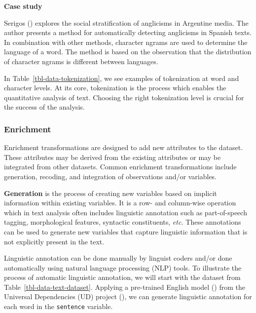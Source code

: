\documentclass[
  letterpaper,
  krantz1]{latex/krantz-mod}
\theoremstyle{definition}
\theoremstyle{definition}
\theoremstyle{remark}
\begin{document}
\begin{tcolorbox}[enhanced jigsaw, toprule=.15mm, breakable, colback=white, arc=.35mm, left=2mm, colframe=quarto-callout-color-frame, opacityback=0, bottomrule=.15mm, rightrule=.15mm, leftrule=.75mm]

\textbf{ Case study}

Serigos () explores the social
stratification of anglicisms in Argentine media. The author presents a
method for automatically detecting anglicisms in Spanish texts. In
combination with other methods, character ngrams are used to determine
the language of a word. The method is based on the observation that the
distribution of character ngrams is different between languages.

\end{tcolorbox}

In Table~\ref{tbl-data-tokenization}, we see examples of tokenization at
word and character levels. At its core,
tokenization is the process which enables the
quantitative analysis of text. Choosing the right tokenization level is
crucial for the success of the analysis.

\subsubsection{Enrichment}\label{enrichment}

Enrichment transformations are designed to add new attributes to the
dataset. These attributes may be derived from
the existing attributes or may be integrated from other datasets. Common
enrichment transformations include
generation,
recoding, and
integration of observations and/or
variables.

\textbf{Generation} is the process of
creating new variables based on implicit information within existing
variables. It is a row- and column-wise operation which
in text analysis often includes linguistic
annotation such as part-of-speech
tagging, morphological
features, syntactic
constituents, \emph{etc.} These
annotations can be used to generate new variables that
capture linguistic information that is not explicitly present in the
text.

Linguistic annotation can be done manually by linguist coders and/or
done automatically using natural language processing (NLP) tools. To
illustrate the process of automatic linguistic annotation, we will start
with the dataset from Table~\ref{tbl-data-text-dataset}. Applying a
pre-trained English model () from the Universal Dependencies (UD)
project
(), we can generate linguistic annotation for each word in the
\texttt{sentence} variable.
\end{document}
